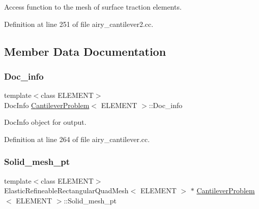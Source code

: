 Access function to the mesh of surface traction elements. 



Definition at line 251 of file airy\+\_\+cantilever2.\+cc.



\subsection{Member Data Documentation}
\mbox{\label{classCantileverProblem_a2d230bb59f229cf02a06a50493dd48e4}} 
\subsubsection{\texorpdfstring{Doc\+\_\+info}{Doc\_info}}
{\footnotesize\ttfamily template$<$class E\+L\+E\+M\+E\+NT$>$ \\
Doc\+Info \hyperlink{classCantileverProblem}{Cantilever\+Problem}$<$ E\+L\+E\+M\+E\+NT $>$\+::Doc\+\_\+info\hspace{0.3cm}{\ttfamily [private]}}



Doc\+Info object for output. 



Definition at line 264 of file airy\+\_\+cantilever.\+cc.

\mbox{\label{classCantileverProblem_a263ff19e4aa0fa4391582242763f08f1}} 
\subsubsection{\texorpdfstring{Solid\+\_\+mesh\+\_\+pt}{Solid\_mesh\_pt}\hspace{0.1cm}{\footnotesize\ttfamily [1/2]}}
{\footnotesize\ttfamily template$<$class E\+L\+E\+M\+E\+NT$>$ \\
Elastic\+Refineable\+Rectangular\+Quad\+Mesh$<$ E\+L\+E\+M\+E\+NT $>$ $\ast$ \hyperlink{classCantileverProblem}{Cantilever\+Problem}$<$ E\+L\+E\+M\+E\+NT $>$\+::Solid\+\_\+mesh\+\_\+pt\hspace{0.3cm}{\ttfamily [private]}}



